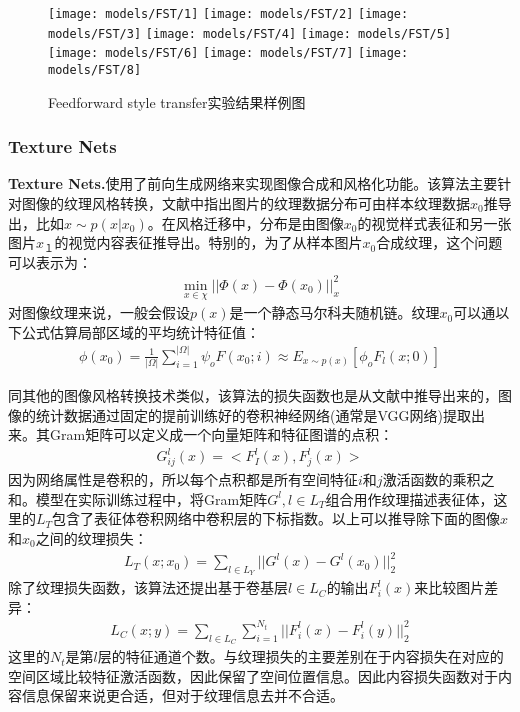 \begin{figure}[ht]
    \centering
    \texttt{[image: models/FST/1]}
    \texttt{[image: models/FST/2]}
    \texttt{[image: models/FST/3]}
    \texttt{[image: models/FST/4]}
    \texttt{[image: models/FST/5]}
    \texttt{[image: models/FST/6]}
    \texttt{[image: models/FST/7]}
    \texttt{[image: models/FST/8]}
    \caption{Feedforward style transfer实验结果样例图}
    \label{fig:fst}
\end{figure}

\subsubsection{Texture Nets}

\textbf{Texture Nets.}\cite{texture-nets}\quad 使用了前向生成网络来实现图像合成和风格化功能。该算法主要针对图像的纹理风格转换，文献\cite{texture-nets}中指出图片的纹理数据分布可由样本纹理数据$x_0$推导出，比如$x\sim p(x|x_0)$。在风格迁移中，分布是由图像$x_0$的视觉样式表征和另一张图片$x_１$的视觉内容表征推导出。特别的，为了从样本图片$x_0$合成纹理，这个问题可以表示为：
\begin{align}
    \min_{x\in \chi}||\Phi(x)-\Phi(x_0)||_x^2
\end{align}
对图像纹理来说，一般会假设$p(x)$是一个静态马尔科夫随机链。纹理$x_0$可以通以下公式估算局部区域的平均统计特征值：
\begin{align}
    \phi(x_0)=\frac{1}{|\Omega|}\sum_{i=1}^{|\Omega|}\psi_oF(x_0;i)\approx E_{x\sim p(x)}[\phi_oF_l(x;0)]
\end{align}

同其他的图像风格转换技术类似，该算法的损失函数也是从文献\cite{nst}中推导出来的，图像的统计数据通过固定的提前训练好的卷积神经网络(通常是VGG网络)提取出来。其Gram矩阵可以定义成一个向量矩阵和特征图谱的点积：
\begin{align}
    G_{ij}^l(x)=<F_I^l(x),F_j^l(x)>
\end{align}
因为网络属性是卷积的，所以每个点积都是所有空间特征$i$和$j$激活函数的乘积之和。模型在实际训练过程中，将Gram矩阵$G^l,l\in L_T$组合用作纹理描述表征体，这里的$L_T$包含了表征体卷积网络中卷积层的下标指数。以上可以推导除下面的图像$x$和$x_0$之间的纹理损失：
\begin{align}
    L_T(x;x_0)=\sum_{l\in L_Y}||G^l(x)-G^l(x_0)||_2^2
\end{align}
除了纹理损失函数，该算法还提出基于卷基层$l\in L_C$的输出$F_i^l(x)$来比较图片差异：
\begin{align}
    L_C(x;y)=\sum_{l\in L_C}\sum_{i=1}^{N_t}||F_i^l(x)-F_i^l(y)||_2^2
\end{align}
这里的$N_t$是第$l$层的特征通道个数。与纹理损失的主要差别在于内容损失在对应的空间区域比较特征激活函数，因此保留了空间位置信息。因此内容损失函数对于内容信息保留来说更合适，但对于纹理信息去并不合适。

